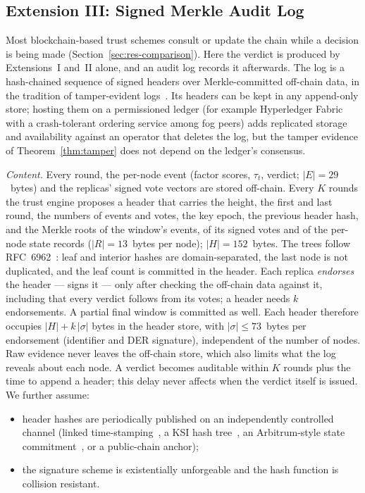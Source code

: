 \documentclass{ieeeaccess}
\begin{document}
\subsection{Extension III: Signed Merkle Audit Log}
\label{sec:ext3}
Most blockchain-based trust schemes consult or update the chain while
a decision is being made (Section~\ref{sec:res-comparison}).  Here the
verdict is produced by Extensions~I and~II alone, and an audit log
records it afterwards.  The log is a hash-chained sequence of signed
headers over Merkle-committed off-chain data, in the tradition of
tamper-evident logs~\cite{schneier1999secure,crosby2009efficient,laurie2013rfc6962}.
Its headers can be kept in any append-only store; hosting them on a
permissioned ledger (for example Hyperledger Fabric with a
crash-tolerant ordering service among fog peers) adds replicated
storage and availability against an operator that deletes the log, but
the tamper evidence of Theorem~\ref{thm:tamper} does not depend on the
ledger's consensus.

\emph{Content.}  Every round, the per-node event (factor scores,
$\tau_t$, verdict; $|E|=29$~bytes) and the replicas' signed vote
vectors are stored off-chain.  Every $K$ rounds the trust engine
proposes a header that carries the height, the first and last round,
the numbers of events and votes, the key epoch, the previous header
hash, and the Merkle roots of the window's events, of its signed votes
and of the per-node state records ($|R|=13$~bytes per node);
$|H|=152$~bytes.  The trees follow RFC~6962~\cite{laurie2013rfc6962}:
leaf and interior hashes are domain-separated, the last node is not
duplicated, and the leaf count is committed in the header.  Each
replica \emph{endorses} the header --- signs it --- only after checking
the off-chain data against it, including that every verdict follows
from its votes; a header needs $k$ endorsements.  A partial final
window is committed as well.  Each header therefore occupies
$|H|+k\,|\sigma|$ bytes in the header store, with $|\sigma|\le73$~bytes per
endorsement (identifier and DER signature), independent of the number
of nodes.  Raw evidence never
leaves the off-chain store, which also limits what the log reveals
about each node.  A verdict becomes auditable within $K$ rounds plus
the time to append a header; this delay never affects when the verdict
itself is issued.  We further assume:
\begin{itemize}
\item[(C1)] header hashes are periodically published on an
independently controlled channel (linked
time-stamping~\cite{haber1991time}, a KSI hash
tree~\cite{buldas2013ksi}, an Arbitrum-style state
commitment~\cite{kalodner2018arbitrum}, or a public-chain anchor);
\item[(C2)] the signature scheme is existentially unforgeable and
the hash function is collision resistant.
\end{itemize}
\end{document}
